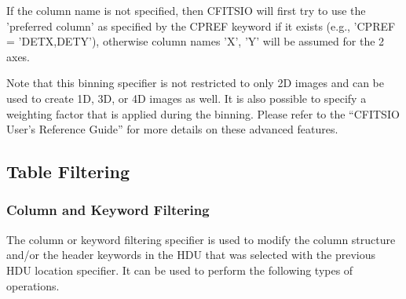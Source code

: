 \documentclass[11pt]{article}
\begin{document}
If the column name is not specified, then CFITSIO will first try to use
the 'preferred column' as specified by the CPREF keyword if it exists
(e.g., 'CPREF = 'DETX,DETY'), otherwise column names 'X', 'Y' will be
assumed for the 2 axes.

Note that this binning specifier is not restricted to only 2D images
and can be used to create 1D, 3D, or 4D images as well.  It is also
possible to specify a weighting factor that is applied during the
binning.  Please refer to the ``CFITSIO User's Reference Guide'' for
more details on these advanced features.
\newpage

\subsection{Table Filtering}

\subsubsection{Column and Keyword Filtering}

The column or keyword filtering specifier is used to modify the
column structure and/or the header keywords in the HDU that was
selected with the previous HDU location specifier.   It can
be used to perform the following types of operations. 
\end{document}
